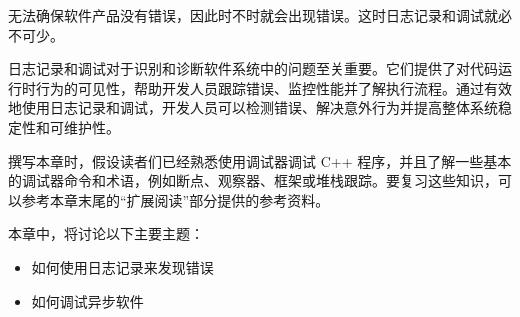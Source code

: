 无法确保软件产品没有错误，因此时不时就会出现错误。这时日志记录和调试就必不可少。

日志记录和调试对于识别和诊断软件系统中的问题至关重要。它们提供了对代码运行时行为的可见性，帮助开发人员跟踪错误、监控性能并了解执行流程。通过有效地使用日志记录和调试，开发人员可以检测错误、解决意外行为并提高整体系统稳定性和可维护性。

撰写本章时，假设读者们已经熟悉使用调试器调试 C++ 程序，并且了解一些基本的调试器命令和术语，例如断点、观察器、框架或堆栈跟踪。要复习这些知识，可以参考本章末尾的“扩展阅读”部分提供的参考资料。

本章中，将讨论以下主要主题：

\begin{itemize}
\item
如何使用日志记录来发现错误

\item
如何调试异步软件
\end{itemize}